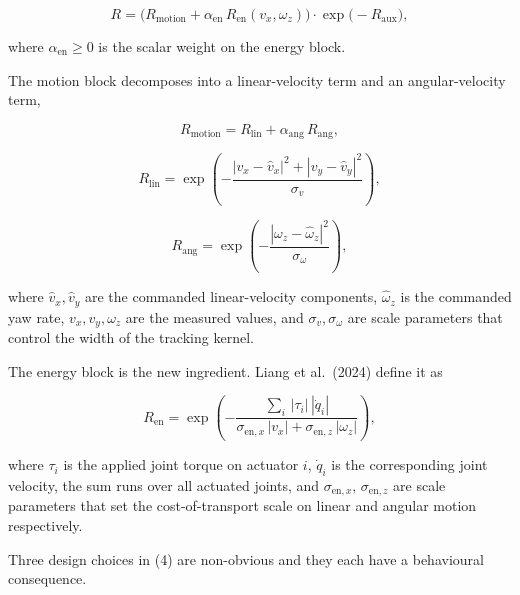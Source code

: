 \[
R = \big( R_{\mathrm{motion}} + \alpha_{\mathrm{en}}\, R_{\mathrm{en}}(v_x, \omega_z) \big) \cdot \exp\!\big( - R_{\mathrm{aux}} \big), \tag{2}
\]

where $\alpha_{\mathrm{en}} \ge 0$ is the scalar weight on the energy block.

The motion block decomposes into a linear-velocity term and an angular-velocity term,

\[
R_{\mathrm{motion}} = R_{\mathrm{lin}} + \alpha_{\mathrm{ang}}\, R_{\mathrm{ang}},
\]

\[
R_{\mathrm{lin}} = \exp\!\left( - \frac{ |v_x - \hat v_x|^2 + |v_y - \hat v_y|^2 }{\sigma_v} \right),
\]

\[
R_{\mathrm{ang}} = \exp\!\left( - \frac{ |\omega_z - \hat\omega_z|^2 }{\sigma_\omega} \right), \tag{3}
\]

where $\hat v_x, \hat v_y$ are the commanded linear-velocity components, $\hat\omega_z$ is the commanded yaw rate, $v_x, v_y, \omega_z$ are the measured values, and $\sigma_v, \sigma_\omega$ are scale parameters that control the width of the tracking kernel.

The energy block is the new ingredient. Liang et al.\ (2024) define it as

\[
R_{\mathrm{en}} = \exp\!\left( - \frac{ \sum_i \, |\tau_i| \, |\dot q_i| }{ \sigma_{\mathrm{en},x}\, |v_x| + \sigma_{\mathrm{en},z}\, |\omega_z| } \right), \tag{4}
\]

where $\tau_i$ is the applied joint torque on actuator $i$, $\dot q_i$ is the corresponding joint velocity, the sum runs over all actuated joints, and $\sigma_{\mathrm{en},x},\, \sigma_{\mathrm{en},z}$ are scale parameters that set the cost-of-transport scale on linear and angular motion respectively.

Three design choices in (4) are non-obvious and they each have a behavioural consequence.

